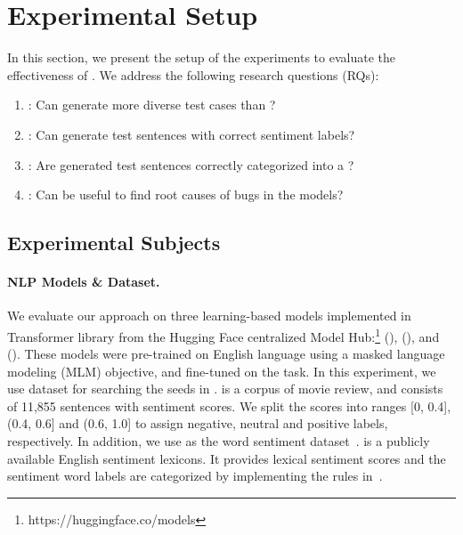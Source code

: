 \section{Experimental Setup}
\label{sec:experiment}
%
In this section, we present the setup of the experiments to evaluate
the effectiveness of \tool{}. We address the following research
questions (RQs):

\begin{enumerate}[label=\textbf{RQ\arabic*}]
\item \label{rq:three}: Can \tool generate more diverse test cases
  than \Cklst?
\item \label{rq:one}: Can \tool generate test sentences with correct sentiment labels?
\item \label{rq:two}: Are \tool generated test sentences correctly categorized into a \lc?
\item \label{rq:four}: Can \tool be useful to find root causes of bugs
  in the \sa models?
\end{enumerate}


\subsection{Experimental Subjects}

\paragraph{\textbf{NLP Models \& Dataset.}}
We evaluate our approach on three learning-based \sa models
implemented in Transformer library from the Hugging Face centralized
Model Hub:\footnote{https://huggingface.co/models} \texttt{\Bert}
(\bertsamodel), \texttt{\Roberta} (\robertasamodel), and \texttt{\Dbert} (\disbertsamodel). These models were pre-trained on English
language using a masked language modeling (MLM) objective, and
fine-tuned on the \sa task. In this experiment, we use \Sstt \cite{socher2013sst} dataset for
searching the seeds in \tool. \Sstt is a
corpus of movie review, and consists of 11,855 sentences
with sentiment scores. We split the
scores into ranges [0, 0.4], (0.4, 0.6] and (0.6, 1.0] to assign 
negative, neutral and positive labels, respectively. In addition, 
we use \Swn as the word sentiment dataset~\cite{baccianella2010sentiwordnet}. 
\Swn is a publicly available English sentiment lexicons.  
It provides lexical sentiment scores and the sentiment word labels 
are categorized by implementing the rules in~\cite{mihaela2017sentiwordnetlabel}.

